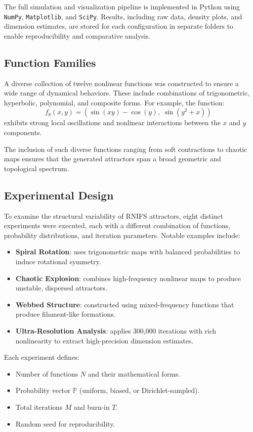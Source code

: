 \documentclass[twocolumn,10pt]{article}
\begin{document}
The full simulation and visualization pipeline is implemented in Python using \texttt{NumPy}, \texttt{Matplotlib}, and \texttt{SciPy}. Results, including raw data, density plots, and dimension estimates, are stored for each configuration in separate folders to enable reproducibility and comparative analysis.

\subsection{Function Families}
\label{subsec:functions}

A diverse collection of twelve nonlinear functions was constructed to ensure a wide range of dynamical behaviors. These include combinations of trigonometric, hyperbolic, polynomial, and composite forms. For example, the function:
\[
f_8(x, y) = \left( \sin(xy) - \cos(y),\; \sin(y^2 + x) \right)
\]
exhibits strong local oscillations and nonlinear interactions between the $x$ and $y$ components.

The inclusion of such diverse functions ranging from soft contractions to chaotic maps ensures that the generated attractors span a broad geometric and topological spectrum.

\subsection{Experimental Design}
\label{subsec:experiments}

To examine the structural variability of RNIFS attractors, eight distinct experiments were executed, each with a different combination of functions, probability distributions, and iteration parameters. Notable examples include:

\begin{itemize}
  \item \textbf{Spiral Rotation}: uses trigonometric maps with balanced probabilities to induce rotational symmetry.
  \item \textbf{Chaotic Explosion}: combines high-frequency nonlinear maps to produce unstable, dispersed attractors.
  \item \textbf{Webbed Structure}: constructed using mixed-frequency functions that produce filament-like formations.
  \item \textbf{Ultra-Resolution Analysis}: applies 300,000 iterations with rich nonlinearity to extract high-precision dimension estimates.
\end{itemize}

Each experiment defines:
\begin{itemize}
  \item Number of functions $N$ and their mathematical forms.
  \item Probability vector $\mathbb{P}$ (uniform, biased, or Dirichlet-sampled).
  \item Total iterations $M$ and burn-in $T$.
  \item Random seed for reproducibility.
\end{itemize}
\end{document}
